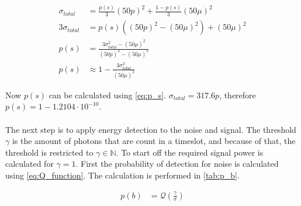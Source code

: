 \begin{align}
	\sigma_{total} &= \frac{p(s)}{3}(50p)^2 + \frac{1-p(s)}{3}(50\mu)^2 \\
	3\sigma_{total} &= p(s)((50p)^2-(50\mu)^2)+(50\mu)^2\\
	p(s) &= \frac{3\sigma_{total}^2-(50\mu)^2}{(50p)^2-(50\mu)^2}\\
	p(s) &\approx 1- \frac{3\sigma_{total}^2}{(50\mu)^2} \label{eq:p_s}
\end{align}

Now $p(s)$ can be calculated using \cref{eq:p_s}. $\sigma_{total} = 317.6p$, therefore $p(s)=1-1.2104\cdot10^{-10}$.\\
\\
The next step is to apply energy detection to the noise and signal. The threshold $\gamma$ is the amount of photons that are count in a timeslot, and because of that, the threshold is restricted to $\gamma \in \mathbb{N}$. To start off the required signal power is calculated for $\gamma=1$. First the probability of detection for noise is calculated  using \cref{eq:Q_function}. The calculation is performed in \cref{tab:p_b}.

\begin{align}\label{eq:Q_function}
	p(b) &=\mathcal{Q}(\frac{\gamma}{\sigma})
\end{align}

